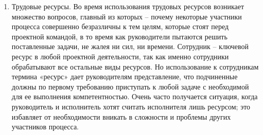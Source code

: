 \documentclass{../industrial-development}
\begin{document}
\begin{enumerate}
\item Трудовые ресурсы. Во время использования трудовых ресурсов возникает множество вопросов, главный из которых – почему некоторые участники процесса совершенно безразличны к тем целям, которые стоят перед проектной командой, в то время как руководители пытаются решить поставленные задачи, не жалея ни сил, ни времени. Сотрудник – ключевой ресурс в любой проектной деятельности, так как именно сотрудники обрабатывают все остальные виды ресурсов. Но использование к сотрудникам термина «ресурс» дает руководителям представление, что подчиненные должны по первому требованию приступать к любой задаче с необходимой для ее выполнения компетентностью. Очень часто получается ситуация, когда руководитель и исполнитель хотят считать исполнителя лишь ресурсом; это избавляет от необходимости вникать в сложности и проблемы других участников процесса. 
\end{enumerate}
\end{document}
